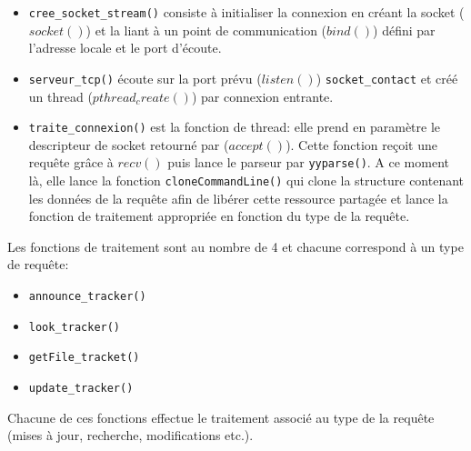 \begin{itemize}
\item \texttt{cree_socket_stream()} consiste à initialiser la connexion en créant la socket ($socket()$) et la liant à un point de communication ($bind()$) défini par l'adresse locale et le port d'écoute.
\item \texttt{serveur_tcp()} écoute sur la port prévu ($listen()$) \texttt{socket_contact} et créé un thread ($pthread_create()$) par connexion entrante.
\item \texttt{traite_connexion()} est la fonction de thread: elle prend en paramètre le descripteur de socket retourné par ($accept()$). Cette fonction reçoit une requête grâce à $recv()$ puis lance le parseur par \texttt{yyparse()}. A ce moment là, elle lance la fonction \texttt{cloneCommandLine()} qui clone la structure contenant les données de la requête afin de libérer cette ressource partagée et lance la fonction de traitement appropriée en fonction du type de la requête.
\end{itemize}

Les fonctions de traitement sont au nombre de 4 et chacune correspond à un type de requête:

\begin{itemize}
\item \texttt{announce_tracker()}
\item \texttt{look_tracker()}
\item \texttt{getFile_tracket()}
\item \texttt{update_tracker()}
\end{itemize}

Chacune de ces fonctions effectue le traitement associé au type de la requête (mises à jour, recherche, modifications etc.).




















